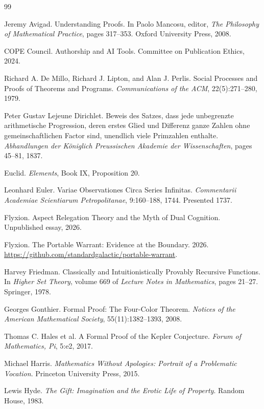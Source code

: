 \documentclass[11pt]{book}
\theoremstyle{definition}
\theoremstyle{remark}
\begin{document}
\begin{thebibliography}{99}

 Jeremy Avigad. Understanding Proofs. In Paolo Mancosu, editor, \emph{The Philosophy of Mathematical Practice}, pages 317--353. Oxford University Press, 2008.

 COPE Council. Authorship and AI Tools. Committee on Publication Ethics, 2024.

 Richard A. De Millo, Richard J. Lipton, and Alan J. Perlis. Social Processes and Proofs of Theorems and Programs. \emph{Communications of the ACM}, 22(5):271--280, 1979.

 Peter Gustav Lejeune Dirichlet. Beweis des Satzes, dass jede unbegrenzte arithmetische Progression, deren erstes Glied und Differenz ganze Zahlen ohne gemeinschaftlichen Factor sind, unendlich viele Primzahlen enthalte. \emph{Abhandlungen der K\"oniglich Preussischen Akademie der Wissenschaften}, pages 45--81, 1837.

 Euclid. \emph{Elements}, Book IX, Proposition 20.

 Leonhard Euler. Variae Observationes Circa Series Infinitas. \emph{Commentarii Academiae Scientiarum Petropolitanae}, 9:160--188, 1744. Presented 1737.

 Flyxion. Aspect Relegation Theory and the Myth of Dual Cognition. Unpublished essay, 2026.

 Flyxion. The Portable Warrant: Evidence at the Boundary. 2026. \url{https://github.com/standardgalactic/portable-warrant}.

 Harvey Friedman. Classically and Intuitionistically Provably Recursive Functions. In \emph{Higher Set Theory}, volume 669 of \emph{Lecture Notes in Mathematics}, pages 21--27. Springer, 1978.

 Georges Gonthier. Formal Proof: The Four-Color Theorem. \emph{Notices of the American Mathematical Society}, 55(11):1382--1393, 2008.

 Thomas C. Hales et al. A Formal Proof of the Kepler Conjecture. \emph{Forum of Mathematics, Pi}, 5:e2, 2017.

 Michael Harris. \emph{Mathematics Without Apologies: Portrait of a Problematic Vocation}. Princeton University Press, 2015.

 Lewis Hyde. \emph{The Gift: Imagination and the Erotic Life of Property}. Random House, 1983.


\end{thebibliography}
\end{document}
